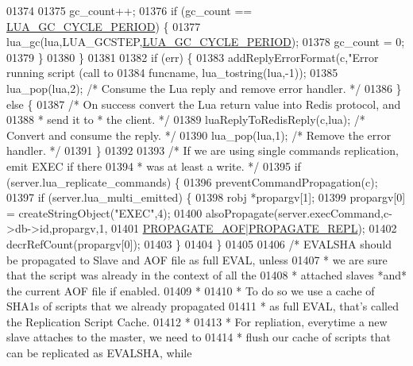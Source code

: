 \begin{DoxyCode}
{{{{{{{{{{{01374 
01375         gc\_count++;
01376         \textcolor{keywordflow}{if} (gc\_count == \hyperlink{scripting_8c_ae050ccd6d490ee95078eda5733c07a58}{LUA\_GC\_CYCLE\_PERIOD}) \{
01377             lua\_gc(lua,LUA\_GCSTEP,\hyperlink{scripting_8c_ae050ccd6d490ee95078eda5733c07a58}{LUA\_GC\_CYCLE\_PERIOD});
01378             gc\_count = 0;
01379         \}
01380     \}
01381 
01382     \textcolor{keywordflow}{if} (err) \{
01383         addReplyErrorFormat(c,\textcolor{stringliteral}{"Error running script (call to %
01384             funcname, lua\_tostring(lua,-1));
01385         lua\_pop(lua,2); \textcolor{comment}{/* Consume the Lua reply and remove error handler. */}
01386     \} \textcolor{keywordflow}{else} \{
01387         \textcolor{comment}{/* On success convert the Lua return value into Redis protocol, and}
01388 \textcolor{comment}{         * send it to * the client. */}
01389         luaReplyToRedisReply(c,lua); \textcolor{comment}{/* Convert and consume the reply. */}
01390         lua\_pop(lua,1); \textcolor{comment}{/* Remove the error handler. */}
01391     \}
01392 
01393     \textcolor{comment}{/* If we are using single commands replication, emit EXEC if there}
01394 \textcolor{comment}{     * was at least a write. */}
01395     \textcolor{keywordflow}{if} (server.lua\_replicate\_commands) \{
01396         preventCommandPropagation(c);
01397         \textcolor{keywordflow}{if} (server.lua\_multi\_emitted) \{
01398             robj *propargv[1];
01399             propargv[0] = createStringObject(\textcolor{stringliteral}{"EXEC"},4);
01400             alsoPropagate(server.execCommand,c->db->id,propargv,1,
01401                 \hyperlink{server_8h_a542fb79924ca427c866fd63632f60777}{PROPAGATE\_AOF}|\hyperlink{server_8h_a59c6e025b4ed85642a0472fc3e73e298}{PROPAGATE\_REPL});
01402             decrRefCount(propargv[0]);
01403         \}
01404     \}
01405 
01406     \textcolor{comment}{/* EVALSHA should be propagated to Slave and AOF file as full EVAL, unless}
01407 \textcolor{comment}{     * we are sure that the script was already in the context of all the}
01408 \textcolor{comment}{     * attached slaves *and* the current AOF file if enabled.}
01409 \textcolor{comment}{     *}
01410 \textcolor{comment}{     * To do so we use a cache of SHA1s of scripts that we already propagated}
01411 \textcolor{comment}{     * as full EVAL, that's called the Replication Script Cache.}
01412 \textcolor{comment}{     *}
01413 \textcolor{comment}{     * For repliation, everytime a new slave attaches to the master, we need to}
01414 \textcolor{comment}{     * flush our cache of scripts that can be replicated as EVALSHA, while}
}}}}}}}}}}}}
\end{DoxyCode}
